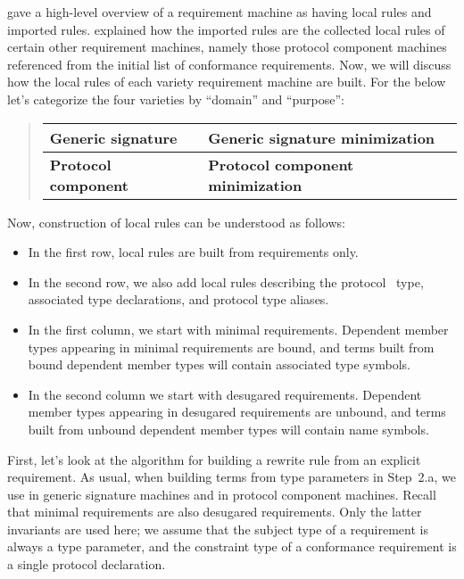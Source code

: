 \documentclass[../generics]{subfiles}
\begin{document}
 gave a high-level overview of a requirement machine as having local rules and imported rules.  explained how the imported rules are the collected local rules of certain other requirement machines, namely those protocol component machines referenced from the initial list of conformance requirements. Now, we will discuss how the local rules of each variety requirement machine are built. For the below let's categorize the four varieties by ``domain'' and ``purpose'':
\begin{quote}
\begin{tabular}{|l|l|}
\hline
\textbf{Generic signature}&\textbf{Generic signature minimization}\\
\hline
\textbf{Protocol component}&\textbf{Protocol component minimization}\\
\hline
\end{tabular}
\end{quote}
Now, construction of local rules can be understood as follows:
\begin{itemize}
\item In the first row, local rules are built from requirements only.

\IndexSelf%
\item In the second row, we also add local rules describing the protocol \tSelf\ type, associated type declarations, and protocol type aliases.

%
%
\item In the first column, we start with minimal requirements. Dependent member types appearing in minimal requirements are bound, and terms built from bound dependent member types will contain associated type symbols.

%
%
\item In the second column we start with desugared requirements. Dependent member types appearing in desugared requirements are unbound, and terms built from unbound dependent member types will contain name symbols.
\end{itemize}
First, let's look at the algorithm for building a rewrite rule from an explicit requirement. As usual, when building terms from type parameters in Step~2.a, we use  in generic signature machines and  in protocol component machines. Recall that minimal requirements are also desugared requirements. Only the latter invariants are used here; we assume that the subject type of a requirement is always a type parameter, and the constraint type of a conformance requirement is a single protocol declaration.
\end{document}

